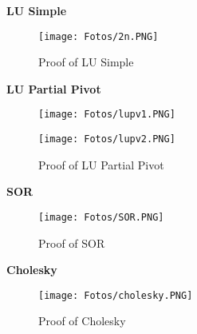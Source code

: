 \documentclass[letterpaper,12pt]{article}
\begin{document}
\textbf{LU Simple}

\begin{figure}[H]
  \texttt{[image: Fotos/2n.PNG]}
  \caption{Proof of LU Simple}
  \label{fig:cond}
\end{figure}
\textbf{\textbf{\textbf{}}}

\textbf{LU Partial Pivot}

\begin{figure}[H]
  \texttt{[image: Fotos/lupv1.PNG]}
  \label{fig:cond}
\end{figure}
\textbf{\textbf{\textbf{}}}

\begin{figure}[H]
  \texttt{[image: Fotos/lupv2.PNG]}
  \caption{Proof of LU Partial Pivot}
  \label{fig:cond}
\end{figure}
\textbf{\textbf{\textbf{}}}

\textbf{SOR}

\begin{figure}[H]
  \texttt{[image: Fotos/SOR.PNG]}
  \caption{Proof of SOR}
  \label{fig:cond}
\end{figure}
\textbf{\textbf{\textbf{}}}

\textbf{Cholesky}
\begin{figure}[H]
  \texttt{[image: Fotos/cholesky.PNG]}
  \caption{Proof of Cholesky}
  \label{fig:cond}
\end{figure}
\end{document}
